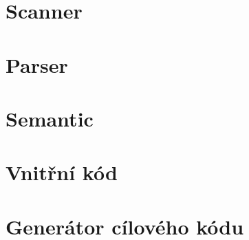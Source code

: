 \documentclass[12pt]{article}
\begin{document}
\section{Scanner}


\section{Parser}


\section{Semantic}


\section{Vnitřní kód}


\section{Generátor cílového kódu}

\end{document}
